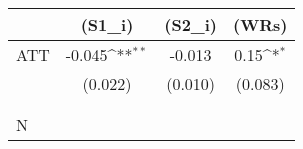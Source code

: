 {
\def\sym#1{\ifmmode^{#1}\else\(^{#1}\)\fi}
\begin{tabular}{l*{3}{c}}
\hline\hline
                    &      (S1\_i)         &      (S2\_i)         &       (WRs)         \\
\hline
ATT                 &      -0.045\sym{**} &      -0.013         &        0.15\sym{*}  \\
                    &     (0.022)         &     (0.010)         &     (0.083)         \\
                    &                     &                     &                     \\
                    &                     &                     &                     \\
\hline
N                   &                     &                     &                     \\
\hline\hline
\end{tabular}
}
